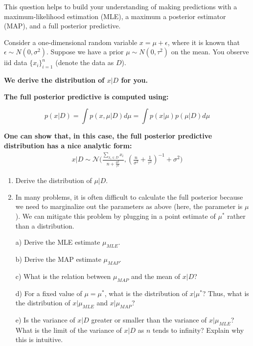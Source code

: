 \documentclass[submit]{harvardml}
\begin{document}
\begin{problem}

  This question helps to build your understanding of making
  predictions with a maximum-likelihood estimation (MLE), a maximum a
  posterior estimator (MAP), and a full posterior predictive.

  Consider a one-dimensional random variable $x = \mu + \epsilon$,
  where it is known that $\epsilon \sim N(0,\sigma^2)$.  Suppose we
  have a prior $\mu \sim N(0,\tau^2)$ on the mean. You observe iid data $\{x_i\}_{i=1}^n$ (denote the data as $D$).


\textbf{We derive the distribution of $x|D$ for you.}

\textbf{The full posterior predictive is computed using:}

$$p(x|D)=\int p(x, \mu|D) d\mu =\int p(x|\mu)p(\mu|D) d\mu $$


\textbf{One can show that, in this case, the full posterior predictive distribution has a nice analytic
  form:}
   \begin{align}
        x|D \sim \mathcal{N}\Bigg(\frac{\sum_{x_i\in D}x_i}{n+\frac{\sigma^2}{\tau^2}}, (\frac{n}{\sigma^2}+\frac{1}{\tau^2})^{-1} + \sigma^2\Bigg)
     \end{align}

\begin{enumerate}

  \item Derive the distribution of $\mu|D$.

  \item 
  In many problems, it is often difficult to
  calculate the full posterior because we need to marginalize out the parameters as above (here,
  the parameter is $\mu$). We can mitigate this problem by plugging in
  a point estimate of $\mu^*$ rather than a distribution.

  a) Derive the MLE
  estimate $\mu_{MLE}$.
  
  b) Derive the MAP estimate $\mu_{MAP}$. %

  c) What is the relation between $\mu_{MAP}$ and the mean of $x|D$?

  d) For a fixed value of $\mu=\mu^*$, what is the distribution of $x|\mu^*$? Thus, what is the distribution of $x|\mu_{MLE}$ and $x|\mu_{MAP}$?

  e) Is the variance of $x|D$ greater or smaller than the variance of $x|\mu_{MLE}$? What is the limit of the variance of $x|D$ as $n$ tends to infinity? Explain why this is intuitive.



\end{enumerate}
\end{problem}
\end{document}
